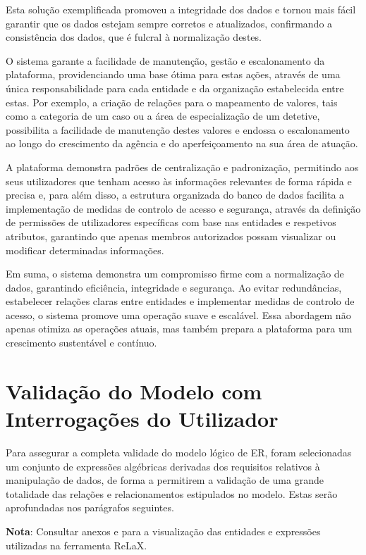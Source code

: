 \documentclass[a4paper,12pt]{scrreprt}
\begin{document}
        Esta solução exemplificada promoveu a integridade dos dados e tornou mais fácil garantir que os dados estejam sempre corretos e atualizados, confirmando a consistência dos dados, que é fulcral à normalização destes.

        O sistema garante a facilidade de manutenção, gestão e escalonamento da plataforma, providenciando uma base ótima para estas ações, através de uma única responsabilidade para cada entidade e da organização estabelecida entre estas. Por exemplo, a criação de relações para o mapeamento de valores, tais como a categoria de um caso ou a área de especialização de um detetive, possibilita a facilidade de manutenção destes valores e endossa o escalonamento ao longo do crescimento da agência e do aperfeiçoamento na sua área de atuação.

        A plataforma demonstra padrões de centralização e padronização, permitindo aos seus utilizadores que tenham acesso às informações relevantes de forma rápida e precisa e, para além disso, a estrutura organizada do banco de dados facilita a implementação de medidas de controlo de acesso e segurança, através da definição de permissões de utilizadores específicas com base nas entidades e respetivos atributos, garantindo que apenas membros autorizados possam visualizar ou modificar determinadas informações.

        Em suma, o sistema demonstra um compromisso firme com a normalização de dados, garantindo eficiência, integridade e segurança. Ao evitar redundâncias, estabelecer relações claras entre entidades e implementar medidas de controlo de acesso, o sistema promove uma operação suave e escalável. Essa abordagem não apenas otimiza as operações atuais, mas também prepara a plataforma para um crescimento sustentável e contínuo.


    \clearpage
    \section{Validação do Modelo com Interrogações do Utilizador}
        Para assegurar a completa validade do modelo lógico de ER, foram selecionadas um conjunto de expressões algébricas derivadas dos requisitos relativos à manipulação de dados, de forma a permitirem a validação de uma grande totalidade das relações e relacionamentos estipulados no modelo. Estas serão aprofundadas nos parágrafos seguintes.

        \textbf{Nota}: Consultar anexos \textit{} e \textit{} para a visualização das entidades e expressões utilizadas na ferramenta ReLaX.
\end{document}
